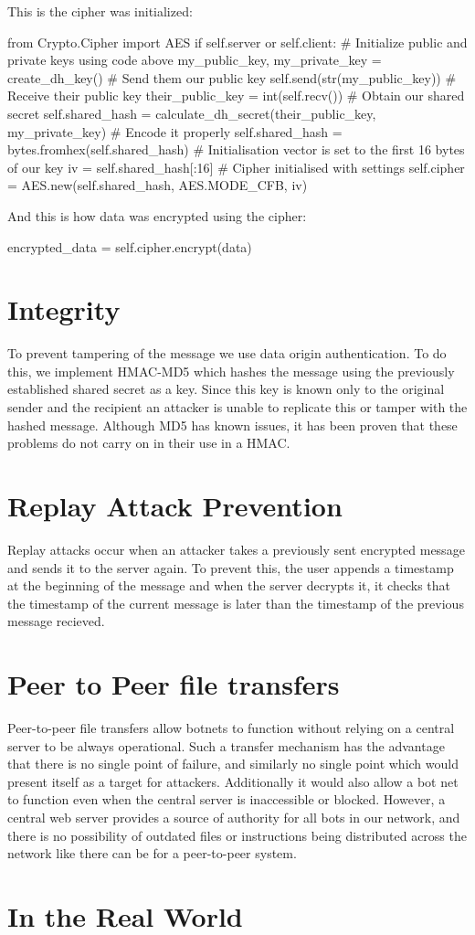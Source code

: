 \documentclass[12pt,a4paper]{article}
\begin{document}
This is the cipher was initialized:
\begin{center}
\begin{python}
from Crypto.Cipher import AES
if self.server or self.client:
    # Initialize public and private keys using code above
    my_public_key, my_private_key = create_dh_key()
    # Send them our public key
    self.send(str(my_public_key))
    # Receive their public key
    their_public_key = int(self.recv())
    # Obtain our shared secret
    self.shared_hash = calculate_dh_secret(their_public_key, my_private_key)
    # Encode it properly
    self.shared_hash = bytes.fromhex(self.shared_hash)
# Initialisation vector is set to the first 16 bytes of our key
iv = self.shared_hash[:16]
# Cipher initialised with settings
self.cipher = AES.new(self.shared_hash, AES.MODE_CFB, iv)
\end{python}
\end{center}
And this is how data was encrypted using the cipher:
\begin{center}\begin{python}
encrypted_data = self.cipher.encrypt(data)
\end{python}\end{center}

\section{Integrity}
To prevent tampering of the message we use data origin authentication. To do this, we implement HMAC-MD5 which hashes the message using the previously established shared secret as a key. Since this key is known only to the original sender and the recipient an attacker is unable to replicate this or tamper with the hashed message. Although MD5 has known issues, it has been proven that these problems do not carry on in their use in a HMAC.

\section{Replay Attack Prevention}
Replay attacks occur when an attacker takes a previously sent encrypted message and sends it to the server again. To prevent this, the user appends a timestamp at the beginning of the message and when the server decrypts it, it checks that the timestamp of the current message is later than the timestamp of the previous message recieved.

\section{Peer to Peer file transfers}
Peer-to-peer file transfers allow botnets to function without relying on a central server to be always operational. Such a transfer mechanism has the advantage that there is no single point of failure, and similarly no single point which would present itself as a target for attackers. Additionally it would also allow a bot net to function even when the central server is inaccessible or blocked. However, a central web server provides a source of authority for all bots in our network, and there is no possibility of outdated files or instructions being distributed across the network like there can be for a peer-to-peer system.

\section{In the Real World}
\end{document}
